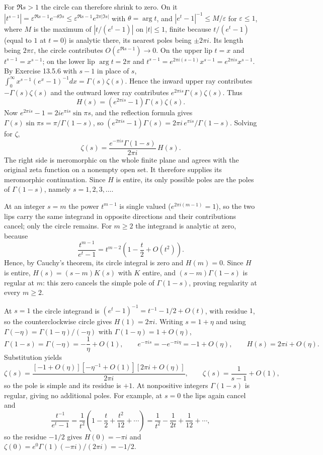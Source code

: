 For $\Re s>1$ the circle can therefore shrink to zero.  On it
$|t^{s-1}|=\varepsilon^{\Re s-1}e^{-\theta\Im s}
\le\varepsilon^{\Re s-1}e^{2\pi|\Im s|}$ with $\theta=\arg t$,
and $|e^t-1|^{-1}\le M/\varepsilon$ for $\varepsilon\le1$, where
$M$ is the maximum of $|t/(e^t-1)|$ on $|t|\le1$, finite because
$t/(e^t-1)$ (equal to $1$ at $t=0$) is analytic there, its nearest
poles being $\pm2\pi i$.  Its length being $2\pi\varepsilon$, the circle
contributes $O(\varepsilon^{\Re s-1})\to0$.  On the upper lip
$t=x$ and $t^{s-1}=x^{s-1}$; on the lower lip $\arg t=2\pi$ and
$t^{s-1}=e^{2\pi i(s-1)}x^{s-1}=e^{2\pi is}x^{s-1}$.  By
Exercise 13.5.6 with $s-1$ in place of $s$,
$\int_0^\infty x^{s-1}(e^x-1)^{-1}dx=\Gamma(s)\zeta(s)$.  Hence
the inward upper ray contributes $-\Gamma(s)\zeta(s)$ and the
outward lower ray contributes $e^{2\pi is}\Gamma(s)\zeta(s)$.  Thus
\[
H(s)=(e^{2\pi is}-1)\Gamma(s)\zeta(s).
\]
Now $e^{2\pi is}-1=2ie^{\pi is}\sin\pi s$, and the reflection
formula gives $\Gamma(s)\sin\pi s=\pi/\Gamma(1-s)$, so
$(e^{2\pi is}-1)\Gamma(s)=2\pi i\,e^{\pi is}/\Gamma(1-s)$.
Solving for $\zeta$,
\[
\boxed{\zeta(s)=\frac{e^{-\pi is}\Gamma(1-s)}{2\pi i}\,H(s)}.
\]
The right side is meromorphic on the whole finite plane and
agrees with the original zeta function on a nonempty open set.
It therefore supplies its meromorphic continuation.  Since
$H$ is entire, its only possible poles are the poles of
$\Gamma(1-s)$, namely $s=1,2,3,\ldots$.

At an integer $s=m$ the power $t^{m-1}$ is single valued
($e^{2\pi i(m-1)}=1$), so the two lips carry the same integrand
in opposite directions and their contributions cancel; only the
circle remains.  For $m\ge2$ the integrand is analytic at zero,
because
\[
\frac{t^{m-1}}{e^t-1}
=t^{m-2}\left(1-\frac t2+O(t^2)\right).
\]
Hence, by Cauchy's theorem, its circle integral is zero and
$H(m)=0$.  Since $H$ is entire, $H(s)=(s-m)K(s)$ with $K$ entire,
and $(s-m)\Gamma(1-s)$ is regular at $m$: this zero cancels the
simple pole of $\Gamma(1-s)$, proving regularity at every $m\ge2$.

At $s=1$ the circle integrand is $(e^t-1)^{-1}=t^{-1}-1/2+O(t)$,
with residue $1$, so the counterclockwise circle gives
$H(1)=2\pi i$.  Writing $s=1+\eta$ and using
$\Gamma(-\eta)=\Gamma(1-\eta)/(-\eta)$ with $\Gamma(1-\eta)=1+O(\eta)$,
\[
\Gamma(1-s)=\Gamma(-\eta)=-\frac1\eta+O(1),
\qquad e^{-\pi is}=-e^{-\pi i\eta}=-1+O(\eta),
\qquad H(s)=2\pi i+O(\eta).
\]
Substitution yields
\[
\zeta(s)=\frac{[-1+O(\eta)][-\eta^{-1}+O(1)][2\pi i+O(\eta)]}{2\pi i},
\qquad
\boxed{\zeta(s)=\frac1{s-1}+O(1)},
\]
so the pole is simple and its residue is $+1$.  At nonpositive
integers $\Gamma(1-s)$ is regular, giving no additional poles.
For example, at $s=0$ the lips again cancel and
\[
\frac{t^{-1}}{e^t-1}=\frac1{t^2}\left(1-\frac t2+\frac{t^2}{12}
+\cdots\right)=\frac1{t^2}-\frac1{2t}+\frac1{12}+\cdots,
\]
so the residue $-1/2$ gives $H(0)=-\pi i$ and
$\zeta(0)=e^0\Gamma(1)(-\pi i)/(2\pi i)=-1/2$.

